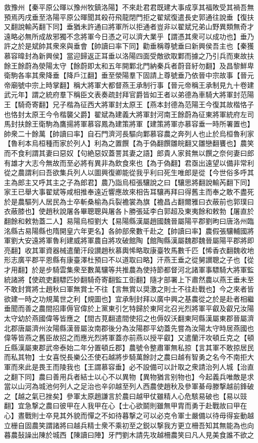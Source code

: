 救豫州【秦平原公暉以豫州牧鎮洛陽】不來赴君君既建大事成享其福敗受其禍吾無預焉丙戌垂至洛陽平原公暉聞其殺苻飛龍閉門拒之翟斌復遣長史郭通往說垂【復扶又翻說輸芮翻下同】垂猶未許通曰將軍所以拒通者豈非以翟斌兄弟山野異類無奇才遠略必無所成故邪獨不念將軍今日憑之可以濟大業乎【謂憑其衆可以成功也】垂乃許之於是斌帥其衆來與垂會【帥讀曰率下同】勸垂稱尊號垂曰新興侯吾主也【秦獲慕容暐封為新興侯】當迎歸返正耳垂以洛陽四面受敵欲取鄴而據之乃引兵而東故扶餘王餘蔚為滎陽太守【餘蔚即太和五年開鄴北門納秦兵者蔚音紆勿翻】及昌黎鮮卑衛駒各率其衆降垂【降戶江翻】垂至滎陽羣下固請上尊號垂乃依晉中宗故事【晉元帝廟號中宗上時掌翻】稱大將軍大都督燕王承制行事【晉元帝稱王承制見九十卷建武元年】謂之統府羣下稱臣文表奏疏封拜官爵皆如王者以弟德為車騎大將軍封范陽王【騎奇寄翻】兄子楷為征西大將軍封太原王【燕本封德為范陽王今復其故楷恪子也恪封太原王今令楷襲父爵】翟斌為建義大將軍封河南王餘蔚為征東將軍統府左司馬封扶餘王衛駒為鷹揚將軍慕容鳳為建策將軍【建策將軍亦慕容垂一時所署置也】帥衆二十餘萬【帥讀曰率】自石門濟河長驅向鄴慕容農之奔列人也止於烏桓魯利家【魯利本烏桓種而家於列人】利為之置饌【為于偽翻饌雛皖翻又雛戀翻饔也】農笑而不食利謂其妻曰惡奴【句絶惡奴蓋詈其妻之語】郎貴人家貧無以饌之奈何妻曰郎有雄才大志今無故而至必將有異非為飲食來也【為于偽翻】君亟出遠望以備非常利從之農謂利曰吾欲集兵列人以圖興復卿能從我乎利曰死生唯郎是從【今世俗多呼其主為郎主又呼其主之子為郎君】農乃詣烏桓張驤說之曰【驤思將翻說輸芮翻下同】家王已舉大事翟斌等咸相推奉遠近響應故來相告耳驤再拜曰得舊主而奉之敢不盡死於是農驅列人居民為士卒斬桑榆為兵裂襜裳為旗【襜昌占翻爾雅曰衣蔽前也郭璞曰衣蔽膝也】使趙秋說屠各畢聰聰與屠各卜勝張延李白郭超及東夷餘和敕勃【屠直於翻餘和敕勃蓋二人】易陽烏桓劉大【易陽縣漢屬趙國魏晉屬陽平郡劉昫曰唐洛州臨洺縣古易陽縣也隋開皇六年更名】各帥部衆數千赴之【帥讀曰率】農假張驤輔國將軍劉大安遠將軍魯利建威將軍農自將攻破館陶【館陶縣漢屬魏郡魏晉屬陽平郡將即亮翻】收其軍資器械遣蘭汗段讃趙秋慕輿悕略取康臺牧馬數千匹【悕香衣翻魏收地形志廣平郡平恩縣有康臺澤杜預曰不以道取曰略】汗燕王垂之從舅讃聰之子也【從才用翻】於是步騎雲集衆至數萬驤等共推農為使持節都督河北諸軍事驃騎大將軍監統諸將【使疏吏翻驃匹妙翻騎奇寄翻監工衘翻】隨才部署上下肅然農以燕王垂未至不敢封賞將士趙秋曰軍無賞士不往【言無賞以奨激之則士不往赴戰也】今之來者皆欲建一時之功規萬世之利【規圖也】宜承制封拜以廣中興之基農從之於是赴者相繼垂聞而善之農間招庫傉官偉於上黨東引乞特歸於東阿北召光烈將軍平叡及叡兄汝陽太守幼於燕國偉等皆應之【間古莧翻遣間使招之也傉奴沃翻東阿縣漢屬東郡晉屬濟北郡唐屬濟州汝陽縣漢晉屬汝南郡後分為汝陽郡平幼蓋先嘗為汝陽太守時居燕國也偉等皆燕之舊臣故招之而應光烈將軍蓋亦前燕以授平叡】又遣蘭汗攻頓丘克之【頓丘縣漢屬東郡武帝泰始二年分置頓丘郡】農號令整肅軍無私掠【言其軍不敢掠居民而私其物】士女喜悦長樂公丕使石越將步騎萬餘討之農曰越有智勇之名今不南拒大軍而來此是畏王而陵我也【王謂慕容垂】必不設備可以計取之衆請治列人城【治直之翻下同】農曰善用兵者結士以心不以異物【異物猶言别物也】今起義兵唯敵是求當以山河為城池何列人之足治也辛卯越至列人西農使趙秋及參軍綦母滕撃越前鋒破之【越之氣已挫矣】參軍太原趙謙言於農曰越甲仗雖精人心危駭易破也【易以豉翻】宜急撃之農曰彼甲在人我甲在心【士心欲鬬則雖無甲胄而勇于赴戰故曰甲在心】晝戰則士卒見其外貌而憚之不如待暮撃之可以必克令軍士嚴備以待毋得妄動越立栅自固農笑謂諸將曰越兵精士衆不乘初至之鋭以撃我方更立柵吾知其無能為也向暮農鼔譟出陳於城西【陳讀曰陣】牙門劉木請先攻越柵農笑曰凡人見美食誰不欲之